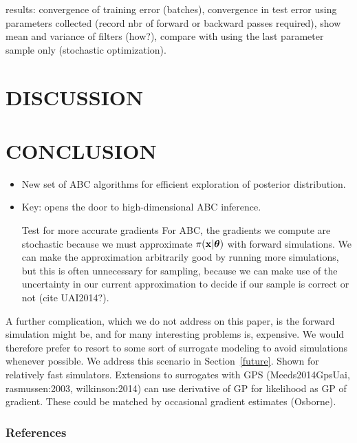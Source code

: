\documentclass[]{article}
\begin{document}
results: convergence of training error (batches), convergence in test error using parameters collected (record nbr of forward or backward passes required), show mean and variance of filters (how?), compare with using the last parameter sample only (stochastic optimization).





\section{DISCUSSION} \label{sec:discussion}


\section{CONCLUSION} \label{sec:conclusion}

\begin{itemize}
  \item New set of ABC algorithms for efficient exploration of posterior distribution.
  \item Key: opens the door to high-dimensional ABC inference.
  \item [Test for more accurate gradients] For ABC, the gradients we compute are stochastic because we must approximate $\pi({\bf x} | {\bm \theta})$ with forward simulations.  We can make the approximation arbitrarily good by running more simulations, but this is often unnecessary for sampling, because we can make use of the uncertainty in our current approximation to decide if our sample is correct or not (cite UAI2014?). 
\end{itemize}

A further complication, which we do not address on this paper, is the forward simulation might be, and for many interesting problems is, expensive.  We would therefore prefer to resort to some sort of surrogate modeling \cite{Meeds2014GpsUai,wilkinson:2014, michael} to avoid simulations whenever possible. We address this scenario in Section~\ref{future}.  Shown for relatively fast simulators.  Extensions to surrogates with GPS (Meeds2014GpsUai, rasmussen:2003, wilkinson:2014) can use derivative of GP for likelihood as GP of gradient.  These could be matched by occasional gradient estimates (Osborne).

\subsubsection*{References}
{


}
\end{document}
